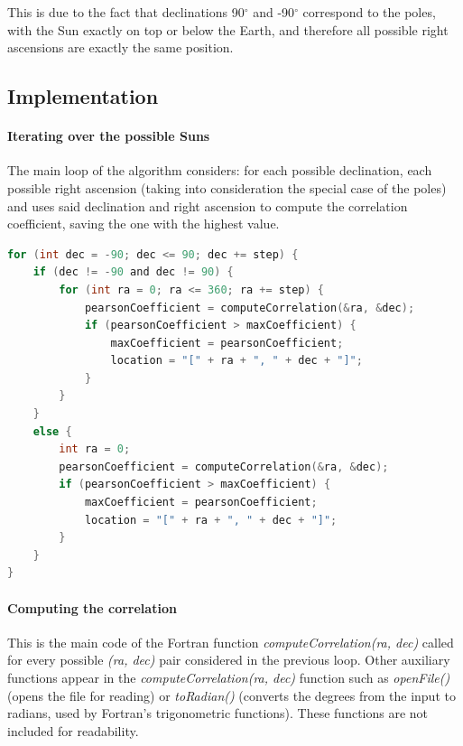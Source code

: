 This is due to the fact that declinations 90$^{\circ}$ and -90$^{\circ}$ correspond to the poles, with the Sun exactly on top or below the Earth, and therefore all possible right ascensions are exactly the same position.

\subsection{Implementation}

\paragraph{Iterating over the possible Suns}

The main loop of the algorithm considers: for each possible declination, each possible right ascension (taking into consideration the special case of the poles) and uses said declination and right ascension to compute the correlation coefficient, saving the one with the highest value.

\begin{minipage}{\linewidth}
\begin{lstlisting}[language=c, caption=Main loops]
for (int dec = -90; dec <= 90; dec += step) {
	if (dec != -90 and dec != 90) {
		for (int ra = 0; ra <= 360; ra += step) {
			pearsonCoefficient = computeCorrelation(&ra, &dec);
			if (pearsonCoefficient > maxCoefficient) {
				maxCoefficient = pearsonCoefficient;
				location = "[" + ra + ", " + dec + "]";
			}
		}
	}
	else {
		int ra = 0;
		pearsonCoefficient = computeCorrelation(&ra, &dec);
		if (pearsonCoefficient > maxCoefficient) {
			maxCoefficient = pearsonCoefficient;
			location = "[" + ra + ", " + dec + "]";
		}
	}
}
\end{lstlisting}
\end{minipage}

\paragraph{Computing the correlation}

This is the main code of the Fortran function \textit{computeCorrelation(ra, dec)} called for every possible \textit{(ra, dec)} pair considered in the previous loop. Other auxiliary functions appear in the \textit{computeCorrelation(ra, dec)} function such as \textit{openFile()} (opens the file for reading) or \textit{toRadian()} (converts the degrees from the input to radians, used by Fortran's trigonometric functions). These functions are not included for readability.

